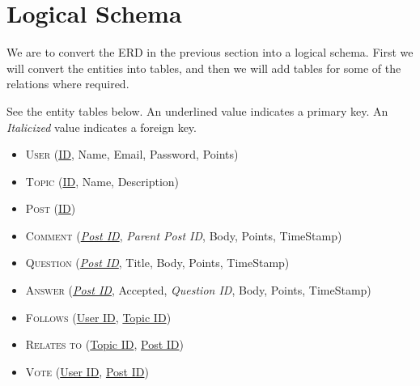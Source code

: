\newcommand{\key}[1]{\underline{#1}}
\newcommand{\fkey}[1]{\textit{#1}}

\section{Logical Schema}

We are to convert the ERD in the previous section into a logical schema. First we will convert the entities into tables, and then we will add tables for some of the relations where required.

See the entity tables below. An underlined value indicates a primary key. An \emph{Italicized} value indicates a foreign key.

\begin{itemize}
	\item[] \textsc{User} (\key{ID}, Name, Email, Password, Points)
	\item[] \textsc{Topic} (\key{ID}, Name, Description)
	\item[] \textsc{Post} (\key{ID})
	\item[] \textsc{Comment} (\key{\fkey{Post ID}}, \fkey{Parent Post ID}, Body, Points, TimeStamp)
	\item[] \textsc{Question} (\key{\fkey{Post ID}}, Title, Body, Points, TimeStamp)
	\item[] \textsc{Answer} (\key{\fkey{Post ID}}, Accepted, \fkey{Question ID}, Body, Points, TimeStamp)
	\item[] \textsc{Follows} (\key{User ID}, \key{Topic ID})
	\item[] \textsc{Relates to} (\key{Topic ID}, \key{Post ID})
	\item[] \textsc{Vote} (\key{User ID}, \key{Post ID})
\end{itemize}